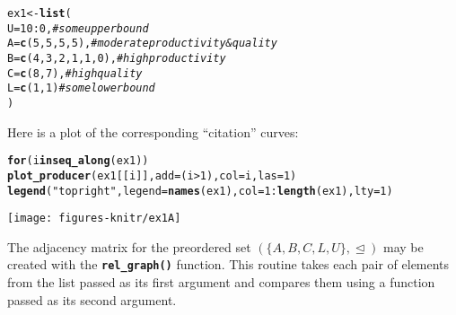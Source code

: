 \documentclass[11pt]{article}\usepackage[]{graphicx}\usepackage[]{color}
\makeatletter
\newcommand{\hlnum}[1]{\textcolor[rgb]{0.686,0.059,0.569}{#1}}%
\newcommand{\hlstr}[1]{\textcolor[rgb]{0.192,0.494,0.8}{#1}}%
\newcommand{\hlcom}[1]{\textcolor[rgb]{0.678,0.584,0.686}{\textit{#1}}}%
\newcommand{\hlopt}[1]{\textcolor[rgb]{0,0,0}{#1}}%
\newcommand{\hlstd}[1]{\textcolor[rgb]{0.345,0.345,0.345}{#1}}%
\newcommand{\hlkwa}[1]{\textcolor[rgb]{0.161,0.373,0.58}{\textbf{#1}}}%
\newcommand{\hlkwb}[1]{\textcolor[rgb]{0.69,0.353,0.396}{#1}}%
\newcommand{\hlkwc}[1]{\textcolor[rgb]{0.333,0.667,0.333}{#1}}%
\newcommand{\hlkwd}[1]{\textcolor[rgb]{0.737,0.353,0.396}{\textbf{#1}}}%
\newenvironment{kframe}{%
 \def\at@end@of@kframe{}%
 \ifinner\ifhmode%
  \def\at@end@of@kframe{\end{minipage}}%
  \begin{minipage}{\columnwidth}%
 \fi\fi%
 \def\FrameCommand##1{\hskip\@totalleftmargin \hskip-\fboxsep
 \colorbox{shadecolor}{##1}\hskip-\fboxsep
     \hskip-\linewidth \hskip-\@totalleftmargin \hskip\columnwidth}%
 \MakeFramed {\advance\hsize-\width
   \@totalleftmargin\z@ \linewidth\hsize
   \@setminipage}}%
 {\par\unskip\endMakeFramed%
 \at@end@of@kframe}
\newenvironment{knitrout}{}{} %
\newcommand{\Rfunc}[1]{\texttt{\hlkwd{#1}}}
\theoremstyle{remark}
\theoremstyle{definition}
\makeatother
\begin{document}
\begin{knitrout}\small
{}\color{fgcolor}\begin{kframe}
\begin{alltt}
\hlstd{ex1} \hlkwb{<-} \hlkwd{list}\hlstd{(}
   \hlkwc{U} \hlstd{=} \hlnum{10}\hlopt{:}\hlnum{0}\hlstd{,}           \hlcom{# some upper bound}
   \hlkwc{A} \hlstd{=} \hlkwd{c}\hlstd{(}\hlnum{5}\hlstd{,}\hlnum{5}\hlstd{,}\hlnum{5}\hlstd{,}\hlnum{5}\hlstd{),}     \hlcom{# moderate productivity & quality}
   \hlkwc{B} \hlstd{=} \hlkwd{c}\hlstd{(}\hlnum{4}\hlstd{,}\hlnum{3}\hlstd{,}\hlnum{2}\hlstd{,}\hlnum{1}\hlstd{,}\hlnum{1}\hlstd{,}\hlnum{0}\hlstd{),} \hlcom{# high productivity}
   \hlkwc{C} \hlstd{=} \hlkwd{c}\hlstd{(}\hlnum{8}\hlstd{,}\hlnum{7}\hlstd{),}         \hlcom{# high quality}
   \hlkwc{L} \hlstd{=} \hlkwd{c}\hlstd{(}\hlnum{1}\hlstd{,}\hlnum{1}\hlstd{)}          \hlcom{# some lower bound}
\hlstd{)}
\end{alltt}
\end{kframe}
\end{knitrout}

Here is a plot of the corresponding ``citation'' curves:

\begin{knitrout}\small
{}\color{fgcolor}\begin{kframe}
\begin{alltt}
\hlkwa{for} \hlstd{(i} \hlkwa{in} \hlkwd{seq_along}\hlstd{(ex1))}
   \hlkwd{plot_producer}\hlstd{(ex1[[i]],} \hlkwc{add}\hlstd{=(i}\hlopt{>}\hlnum{1}\hlstd{),} \hlkwc{col}\hlstd{=i,} \hlkwc{las}\hlstd{=}\hlnum{1}\hlstd{)}
\hlkwd{legend}\hlstd{(}\hlstr{"topright"}\hlstd{,} \hlkwc{legend}\hlstd{=}\hlkwd{names}\hlstd{(ex1),} \hlkwc{col}\hlstd{=}\hlnum{1}\hlopt{:}\hlkwd{length}\hlstd{(ex1),} \hlkwc{lty}\hlstd{=}\hlnum{1}\hlstd{)}
\end{alltt}
\end{kframe}

{\centering \texttt{[image: figures-knitr/ex1A]} 

}



\end{knitrout}

The adjacency matrix for
the preordered set $(\{A, B, C, L, U\}, \trianglelefteq)$
may be created with the \index{\Rfunc{rel\_graph()}}\Rfunc{rel\_graph()} function.
This routine takes each pair of elements from the list passed as its first argument
and compares them using a function passed as its second argument.
\end{document}
